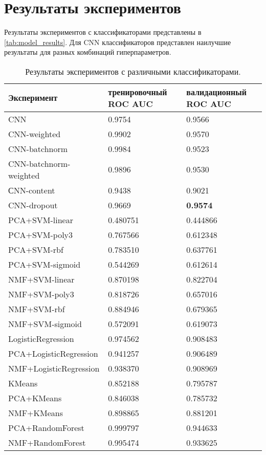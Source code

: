 \section{Результаты экспериментов}

Результаты экспериментов с классификаторами представлены в \autoref{tab:model_results}. Для CNN классификаторов представлен наилучшие результаты для разных комбинаций гиперпараметров.

\begin{table}[H]
\centering
\begin{tabular}{ |p{6cm}||p{3cm}|p{3cm}| }
 \hline
 \rowfont{\scriptsize}%
 \textbf{Эксперимент} & \rowfont{\scriptsize}\textbf{тренировочный ROC AUC} & \rowfont{\scriptsize}\textbf{валидационный ROC AUC}\\
 \hline\hline
 \rowfont{\normalsize}%
CNN & 0.9754 & 0.9566\\
CNN-weighted & 0.9902 & 0.9570 \\
CNN-batchnorm & 0.9984 & 0.9523\\
CNN-batchnorm-weighted & 0.9896 & 0.9530\\
СNN-content & 0.9438 & 0.9021 \\
CNN-dropout & 0.9669 & \textbf{0.9574} \\
\hline
PCA+SVM-linear & 0.480751 & 0.444866\\
PCA+SVM-poly3 & 0.767566 & 0.612348\\
PCA+SVM-rbf & 0.783510 & 0.637761\\
PCA+SVM-sigmoid & 0.544269 & 0.612614\\
\hline
NMF+SVM-linear & 0.870198 & 0.822704\\
NMF+SVM-poly3 & 0.818726 & 0.657016\\
NMF+SVM-rbf & 0.884946 & 0.679365\\
NMF+SVM-sigmoid & 0.572091 & 0.619073\\
\hline
LogisticRegression & 0.974562 & 0.908483 \\
PCA+LogisticRegression & 0.941257 & 0.906489 \\
NMF+LogisticRegression & 0.938370 & 0.908969 \\
\hline
KMeans & 0.852188 & 0.795787 \\
PCA+KMeans & 0.846038 & 0.785732 \\
NMF+KMeans & 0.898865 & 0.881201 \\
\hline
PCA+RandomForest & 0.999797 & 0.944633 \\
NMF+RandomForest & 0.995474 & 0.933625 \\
\hline
\end{tabular}
\caption{Результаты экспериментов с различными классификаторами.}
\label{tab:model_results}
\end{table}

